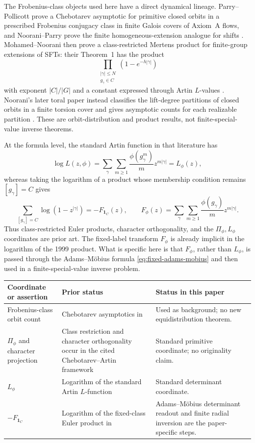 The Frobenius-class objects used here have a direct dynamical lineage.
Parry--Pollicott prove a Chebotarev asymptotic for primitive closed orbits in a
prescribed Frobenius conjugacy class in finite Galois covers of Axiom~A flows,
and Noorani--Parry prove the finite homogeneous-extension analogue for shifts
\cite{ParryPollicott1986Chebotarev,NooraniParry1992ChebotarevShifts}.
Mohamed--Noorani then prove a class-restricted Mertens product for finite-group
extensions of SFTs: their Theorem~1 has the product
\[
 \prod_{\substack{|\gamma|\le N\\g_\gamma\in C}}
 (1-e^{-h|\gamma|})
\]
with exponent \(|C|/|G|\) and a constant expressed through Artin
\(L\)-values \cite[Theorem~1, pp.~124--125]
{MeslizaNoorani1999FrobeniusMertens}.  Noorani's later toral paper instead
classifies the lift-degree partitions of closed orbits in a finite torsion
cover and gives asymptotic counts for each realizable partition
\cite{Noorani2003ClosedOrbitsToral}.  These are orbit-distribution and product
results, not finite-special-value inverse theorems.

At the formula level, the standard Artin function in that literature has
\[
 \log L(z,\phi)
 =\sum_{\gamma}\sum_{m\ge1}
   \frac{\phi(g_\gamma^m)}m z^{m|\gamma|}
 =L_\phi(z),
\]
whereas taking the logarithm of a product whose membership condition remains
\([g_\gamma]=C\) gives
\[
 \sum_{[g_\gamma]=C}\log(1-z^{|\gamma|})
 =-F_{\mathbf1_C}(z),\qquad
 F_\phi(z)=\sum_{\gamma}\sum_{m\ge1}
   \frac{\phi(g_\gamma)}m z^{m|\gamma|}.
\]
Thus class-restricted Euler products, character orthogonality, and the
\(\Pi_\phi,L_\phi\) coordinates are prior art.  The fixed-label transform
\(F_\phi\) is already implicit in the logarithm of the 1999 product.  What is
specific here is that \(F_\phi\), rather than \(L_\phi\), is passed through the
Adams--M\"obius formula \eqref{eq:fixed-adams-mobius} and then used in a
finite-special-value inverse problem.
\begin{center}
\small
\begin{tabular}{@{}L{0.27\textwidth}L{0.29\textwidth}L{0.36\textwidth}@{}}
\toprule
Coordinate or assertion & Prior status & Status in this paper \\
\midrule
Frobenius-class orbit count & Chebotarev asymptotics in
\cite{ParryPollicott1986Chebotarev,NooraniParry1992ChebotarevShifts}
& Used as background; no new equidistribution theorem. \\
\(\Pi_\phi\) and character projection & Class restriction and character
orthogonality occur in the cited Chebotarev--Artin framework
& Standard primitive coordinate; no originality claim. \\
\(L_\phi\) & Logarithm of the standard Artin \(L\)-function
& Standard determinant coordinate. \\
\(-F_{\mathbf1_C}\) & Logarithm of the fixed-class Euler product in
\cite{MeslizaNoorani1999FrobeniusMertens}
& Adams--M\"obius determinant readout and finite radial inversion are the
paper-specific steps. \\
\bottomrule
\end{tabular}
\end{center}

